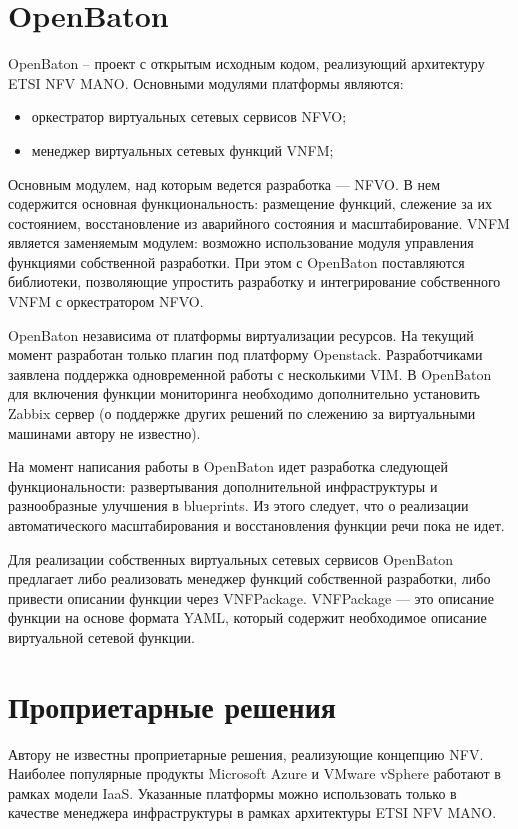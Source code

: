 \documentclass[oneside,final,14pt,a4paper]{extreport}
\begin{document}
\section{OpenBaton}
OpenBaton -- проект с открытым исходным кодом, реализующий архитектуру ETSI NFV MANO. Основными модулями платформы являются:
\begin{itemize}
	\item оркестратор виртуальных сетевых сервисов NFVO;
	\item менеджер виртуальных сетевых функций VNFM;
\end{itemize}

Основным модулем, над которым ведется разработка --- NFVO. В нем содержится основная функциональность: размещение функций, слежение за их состоянием, восстановление из аварийного состояния и масштабирование. VNFM является заменяемым модулем: возможно использование модуля управления функциями собственной разработки. При этом с OpenBaton поставляются библиотеки, позволяющие упростить разработку и интегрирование собственного VNFM с оркестратором NFVO.

OpenBaton независима от платформы виртуализации ресурсов. На текущий момент разработан только плагин под платформу Openstack. Разработчиками заявлена поддержка одновременной работы с несколькими VIM. В OpenBaton для включения функции мониторинга необходимо дополнительно установить Zabbix сервер (о поддержке других решений по слежению за виртуальными машинами автору не известно).

На момент написания работы в OpenBaton идет разработка следующей функциональности: развертывания дополнительной инфраструктуры и разнообразные улучшения в blueprints. Из этого следует, что о реализации автоматического масштабирования и восстановления функции речи пока не идет.

Для реализации собственных виртуальных сетевых сервисов OpenBaton предлагает либо реализовать менеджер функций собственной разработки, либо привести описании функции через VNFPackage. VNFPackage --- это описание функции на основе формата YAML, который содержит необходимое описание виртуальной сетевой функции.\cite{bib:openbaton-official}


\section{Проприетарные решения}
Автору не известны проприетарные решения, реализующие концепцию NFV. Наиболее популярные продукты Microsoft Azure и VMware vSphere работают в рамках модели IaaS. Указанные платформы можно использовать только в качестве менеджера инфраструктуры в рамках архитектуры ETSI NFV MANO.
\end{document}
